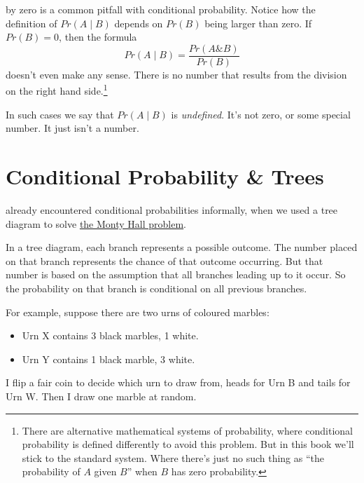\documentclass[justified]{tufte-book}
\providecommand{\tightlist}{%
  \setlength{\itemsep}{0pt}\setlength{\parskip}{0pt}}
\newcommand{\given}{\mid}
\renewcommand{\wedge}{\mathbin{\&}}
\newcommand{\p}{Pr}
\theoremstyle{definition}
\theoremstyle{definition}
\theoremstyle{definition}
\theoremstyle{remark}
\begin{document}
 by zero is a common pitfall with conditional probability. Notice how the definition of \(\p(A \given B)\) depends on \(\p(B)\) being larger than zero. If \(\p(B) = 0\), then the formula
\[ \p(A \given B) = \frac{\p(A \wedge B)}{\p(B)} \]
doesn't even make any sense. There is no number that results from the division on the right hand side.\footnote{There are alternative mathematical systems of probability, where conditional probability is defined differently to avoid this problem. But in this book we'll stick to the standard system. Where there's just no such thing as ``the probability of \(A\) given \(B\)'' when \(B\) has zero probability.}

In such cases we say that \(\p(A \given B)\) is \emph{undefined}. It's not zero, or some special number. It just isn't a number.

\hypertarget{conditional-probability-trees}{%
\section{Conditional Probability \& Trees}\label{conditional-probability-trees}}

 already encountered conditional probabilities informally, when we used a tree diagram to solve \protect\hyperlink{the-monty-hall-problem}{the Monty Hall problem}.

In a tree diagram, each branch represents a possible outcome. The number placed on that branch represents the chance of that outcome occurring. But that number is based on the assumption that all branches leading up to it occur. So the probability on that branch is conditional on all previous branches.

For example, suppose there are two urns of coloured marbles:

\begin{itemize}
\tightlist
\item
  Urn X contains 3 black marbles, 1 white.
\item
  Urn Y contains 1 black marble, 3 white.
\end{itemize}

I flip a fair coin to decide which urn to draw from, heads for Urn B and tails for Urn W. Then I draw one marble at random.
\end{document}
